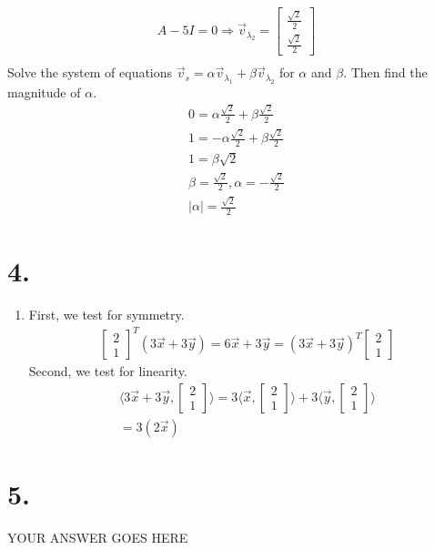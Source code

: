 \documentclass[11pt]{article}
\newenvironment{qparts}{\begin{enumerate}[{(}a{)}]}{\end{enumerate}}
\begin{document}
\begin{qparts}
\begin{align*}
    A-5I = 0 \Longrightarrow \vec{v}_{\lambda_2} = \begin{bmatrix}\frac{\sqrt{2}}{2}\\\frac{\sqrt{2}}{2}\end{bmatrix}\\
\end{align*}
Solve the system of equations $\vec{v}_s = \alpha \vec{v}_{\lambda_1} + \beta  \vec{v}_{\lambda_2}$ for $\alpha$ and $\beta$. Then find the magnitude of $\alpha$.
\begin{align*}
    0 = \alpha \frac{\sqrt{2}}{2} + \beta \frac{\sqrt{2}}{2} \\
    1 = - \alpha \frac{\sqrt{2}}{2} + \beta \frac{\sqrt{2}}{2} \\
    1 = \beta \sqrt{2} \\
    \beta = \frac{\sqrt{2}}{2}, \alpha = -\frac{\sqrt{2}}{2} \\
    |\alpha| = \frac{\sqrt{2}}{2}
\end{align*}
\end{qparts}


\newpage
\section*{4.}
\begin{qparts}
\item
First, we test for symmetry.
\begin{align*}
    \begin{bmatrix}2\\1\end{bmatrix}^T (3\vec{x} + 3\vec{y}) = 6\vec{x} + 3\vec{y} = {(3\vec{x} + 3\vec{y})}^T \begin{bmatrix}2\\1\end{bmatrix}
\end{align*}
Second, we test for linearity.
\begin{align*}
    \langle3\vec{x} + 3\vec{y}, \begin{bmatrix}2\\1\end{bmatrix}\rangle =
    3\langle\vec{x}, \begin{bmatrix}2\\1\end{bmatrix}\rangle + 3\langle\vec{y}, \begin{bmatrix}2\\1\end{bmatrix}\rangle \\
    = 3(2\vec{x})
\end{align*}
\end{qparts}

\newpage
\section*{5.}
YOUR ANSWER GOES HERE
\end{document}
